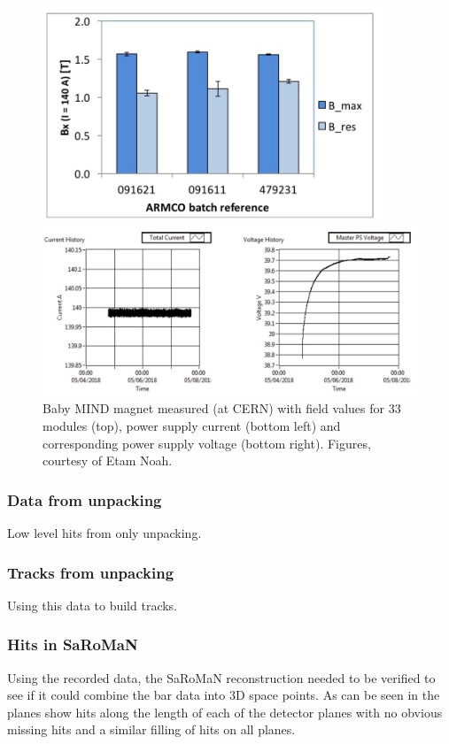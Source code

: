 \begin{figure}[h!]
\centering
\includegraphics[width=0.9\textwidth]{figures/magnetFigure1.jpeg}

\includegraphics[width=\textwidth]{figures/magnetFigure2.jpeg}
\caption{Baby MIND magnet measured (at CERN) with field values for 33 modules (top), power supply current (bottom left) and corresponding power supply voltage (bottom right). Figures, courtesy of Etam Noah.}
\label{fig:Magnetplot1}
\end{figure}



\subsubsection{Data from unpacking}
Low level hits from only unpacking.

\subsubsection{Tracks from unpacking}
Using this data to build tracks.
\fi

\subsubsection{Hits in SaRoMaN}
Using the recorded data, the SaRoMaN reconstruction needed to be verified to see if it could combine the bar data into 3D space points. As can be seen in  the planes show hits along the length of each of the detector planes with no obvious missing hits and a similar filling of hits on all planes.

